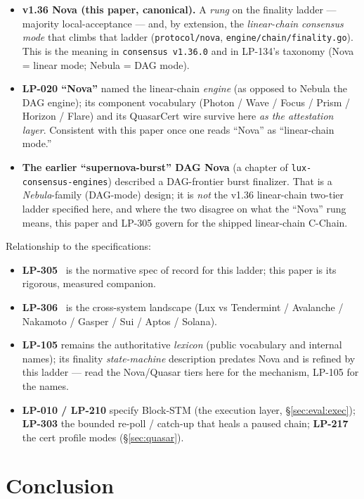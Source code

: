 \documentclass[11pt,a4paper]{article}
\begin{document}
\begin{itemize}[leftmargin=1.4em]
\item \textbf{v1.36 Nova (this paper, canonical).} A \emph{rung} on the finality ladder ---
majority local-acceptance --- and, by extension, the \emph{linear-chain consensus mode} that
climbs that ladder (\texttt{protocol/nova}, \texttt{engine/chain/finality.go}). This is the
meaning in \texttt{consensus v1.36.0} and in LP-134's taxonomy (Nova = linear mode; Nebula =
DAG mode).
\item \textbf{LP-020 ``Nova''} named the linear-chain \emph{engine} (as opposed to Nebula the
DAG engine); its component vocabulary (Photon / Wave / Focus / Prism / Horizon / Flare) and its
QuasarCert wire survive here \emph{as the attestation layer}. Consistent with this paper once
one reads ``Nova'' as ``linear-chain mode.''
\item \textbf{The earlier ``supernova-burst'' DAG Nova} (a chapter of
\texttt{lux-consensus-engines}) described a DAG-frontier burst finalizer. That is a
\emph{Nebula}-family (DAG-mode) design; it is \emph{not} the v1.36 linear-chain two-tier
ladder specified here, and where the two disagree on what the ``Nova'' rung means, this paper
and LP-305 govern for the shipped linear-chain C-Chain.
\end{itemize}

\noindent Relationship to the specifications:
\begin{itemize}[leftmargin=1.4em]
\item \textbf{LP-305}~\cite{lp305} is the normative spec of record for this ladder; this paper
is its rigorous, measured companion.
\item \textbf{LP-306}~\cite{lp306} is the cross-system landscape (Lux vs Tendermint /
Avalanche / Nakamoto / Gasper / Sui / Aptos / Solana).
\item \textbf{LP-105} remains the authoritative \emph{lexicon} (public vocabulary and internal
names); its finality \emph{state-machine} description predates Nova and is refined by this
ladder --- read the Nova/Quasar tiers here for the mechanism, LP-105 for the names.
\item \textbf{LP-010 / LP-210} specify Block-STM (the execution layer, \S\ref{sec:eval:exec});
\textbf{LP-303} the bounded re-poll / catch-up that heals a paused chain; \textbf{LP-217} the
cert profile modes (\S\ref{sec:quasar}).
\end{itemize}

\section{Conclusion}
\end{document}
